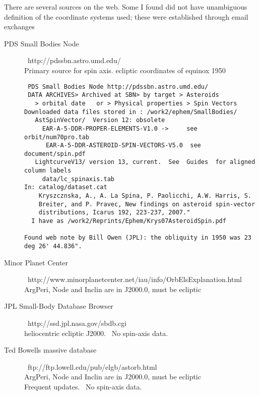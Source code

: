 \documentclass[draft]{article}
\begin{document}
There are several sources on the web. Some I found did not have unambiguous definition of the coordinate systems used; these were established through email exchanges
\begin{description}  %

\item [PDS Small Bodies Node] \  http://pdssbn.astro.umd.edu/
\\ Primary source for spin axis. 
 \qii ecliptic coordinates of equinox 1950\vspace{-3.mm} 
\begin{verbatim}
 PDS Small Bodies Node http://pdssbn.astro.umd.edu/ 
 DATA ARCHIVES> Archived at SBN> by target > Asteroids
   > orbital date   or > Physical properties > Spin Vectors
Downloaded data files stored in : /work2/ephem/SmallBodies/ 
   AstSpinVector/  Version 12: obsolete
     EAR-A-5-DDR-PROPER-ELEMENTS-V1.0 ->     see orbit/num70pro.tab
      EAR-A-5-DDR-ASTEROID-SPIN-VECTORS-V5.0  see document/spin.pdf
   LightcurveV13/ version 13, current.  See  Guides  for aligned column labels
     data/lc_spinaxis.tab
In: catalog/dataset.cat                                                        
    Kryszcznska, A., A. La Spina, P. Paolicchi, A.W. Harris, S.               
    Breiter, and P. Pravec, New findings on asteroid spin-vector              
    distributions, Icarus 192, 223-237, 2007."   
  I have as /work2/Reprints/Ephem/Krys07AsteroidSpin.pdf 

Found web note by Bill Owen (JPL): the obliquity in 1950 was 23 deg 26' 44.836".     
\end{verbatim}

\item [Minor Planet Center]  \  http://www.minorplanetcenter.net/iau/info/OrbElsExplanation.html 
\\ ArgPeri, Node and Inclin are in J2000.0,  must be ecliptic

\item [JPL Small-Body Database Browser]  \ http://ssd.jpl.nasa.gov/sbdb.cgi
\\ heliocentric ecliptic J2000. \ No spin-axis data.

\item [Ted Bowells massive database]   \ ftp://ftp.lowell.edu/pub/elgb/astorb.html
\\ ArgPeri, Node and Inclin are in J2000.0,  must be ecliptic
\\ Frequent updates.  \ No spin-axis data.

\end{description}
\end{document}
